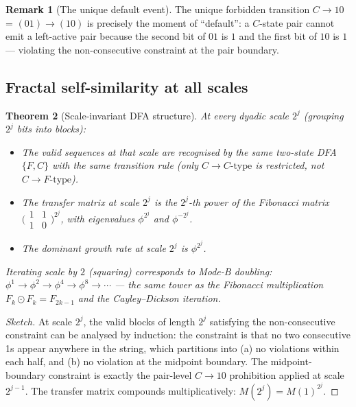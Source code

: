 \documentclass[12pt,reqno]{amsart}
\newtheorem{theorem}{Theorem}[section]
\theoremstyle{definition}
\newtheorem{remark}[theorem]{Remark}
\theoremstyle{plain}
\begin{document}
\begin{remark}[The unique default event]
The unique forbidden transition $C\to 10$ = $(01)\to(10)$ is precisely
the moment of ``default'': a $C$-state pair cannot emit a left-active
pair because the second bit of $01$ is $1$ and the first bit of $10$ is $1$
— violating the non-consecutive constraint at the pair boundary.
\end{remark}

\subsection{Fractal self-similarity at all scales}
\label{ssec:self-similar}

\begin{theorem}[Scale-invariant DFA structure]\label{thm:scale-inv}
At every dyadic scale $2^j$ (grouping $2^j$ bits into blocks):
\begin{itemize}
\item The valid sequences at that scale are recognised by the \emph{same}
  two-state DFA $\{F,C\}$ with the same transition rule (only $C\to C\text{-type}$
  is restricted, not $C\to F\text{-type}$).
\item The transfer matrix at scale $2^j$ is the $2^j$-th power of the
  Fibonacci matrix $\bigl(\begin{smallmatrix}1&1\\1&0\end{smallmatrix}\bigr)^{2^j}$,
  with eigenvalues $\phi^{2^j}$ and $\phi^{-2^j}$.
\item The dominant growth rate at scale $2^j$ is $\phi^{2^j}$.
\end{itemize}
Iterating scale by $2$ (squaring) corresponds to Mode-B doubling:
$\phi^1\to\phi^2\to\phi^4\to\phi^8\to\cdots$
— the same tower as the Fibonacci multiplication $F_k\odot F_k=F_{2k-1}$
and the Cayley--Dickson iteration.
\end{theorem}

\begin{proof}[Sketch]
At scale $2^j$, the valid blocks of length $2^j$ satisfying the
non-consecutive constraint can be analysed by induction: the constraint
is that no two consecutive 1s appear anywhere in the string, which
partitions into (a) no violations within each half, and (b) no violation
at the midpoint boundary.  The midpoint-boundary constraint is exactly
the pair-level $C\to10$ prohibition applied at scale $2^{j-1}$.
The transfer matrix compounds multiplicatively: $M(2^j)=M(1)^{2^j}$.
\end{proof}
\end{document}
